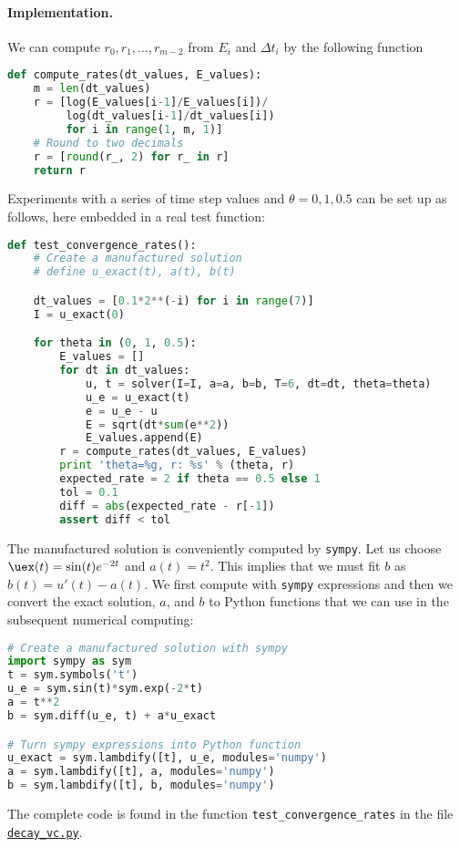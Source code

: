 \documentclass[graybox,sectrefs,envcountresetchap,open=right,final]{svmonodo}
\begin{document}
\paragraph{Implementation.}
We can compute $r_0, r_1, \ldots, r_{m-2}$ from $E_i$ and $\Delta t_i$
by the following function

\begin{lstlisting}[language=Python,style=blue1_bluegreen]
def compute_rates(dt_values, E_values):
    m = len(dt_values)
    r = [log(E_values[i-1]/E_values[i])/
         log(dt_values[i-1]/dt_values[i])
         for i in range(1, m, 1)]
    # Round to two decimals
    r = [round(r_, 2) for r_ in r]
    return r
\end{lstlisting}

Experiments with a series of time step values and $\theta=0,1,0.5$
can be set up as follows, here embedded in a real test function:

\begin{lstlisting}[language=Python,style=blue1_bluegreen]
def test_convergence_rates():
    # Create a manufactured solution
    # define u_exact(t), a(t), b(t)

    dt_values = [0.1*2**(-i) for i in range(7)]
    I = u_exact(0)

    for theta in (0, 1, 0.5):
        E_values = []
        for dt in dt_values:
            u, t = solver(I=I, a=a, b=b, T=6, dt=dt, theta=theta)
            u_e = u_exact(t)
            e = u_e - u
            E = sqrt(dt*sum(e**2))
            E_values.append(E)
        r = compute_rates(dt_values, E_values)
        print 'theta=%g, r: %s' % (theta, r)
        expected_rate = 2 if theta == 0.5 else 1
        tol = 0.1
        diff = abs(expected_rate - r[-1])
        assert diff < tol
\end{lstlisting}

The manufactured solution is conveniently computed by \texttt{sympy}.
Let us choose $\uex(t) = \sin(t)e^{-2t}$ and $a(t)=t^2$.
This implies that we must fit $b$ as $b(t)=u'(t)-a(t)$.
We first compute with \texttt{sympy} expressions and then we convert
the exact solution, $a$, and $b$ to Python functions that we
can use in the subsequent numerical computing:

\begin{lstlisting}[language=Python,style=blue1_bluegreen]
# Create a manufactured solution with sympy
import sympy as sym
t = sym.symbols('t')
u_e = sym.sin(t)*sym.exp(-2*t)
a = t**2
b = sym.diff(u_e, t) + a*u_exact

# Turn sympy expressions into Python function
u_exact = sym.lambdify([t], u_e, modules='numpy')
a = sym.lambdify([t], a, modules='numpy')
b = sym.lambdify([t], b, modules='numpy')
\end{lstlisting}
The complete code is found in the function \Verb!test_convergence_rates!
in the file \href{{http://tinyurl.com/ofkw6kc/genz/decay_vc.py}}{\nolinkurl{decay_vc.py}}.
\end{document}
